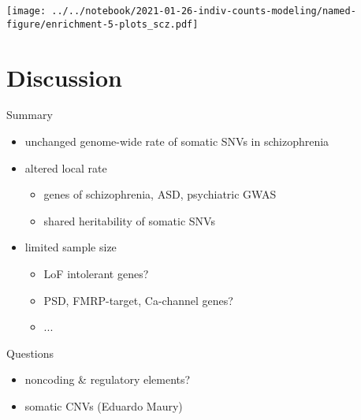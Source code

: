 \documentclass[usenames,dvipsnames]{beamer}
\begin{document}

\begin{frame}[label=results]
\texttt{[image: ../../notebook/2021-01-26-indiv-counts-modeling/named-figure/enrichment-5-plots\_scz.pdf]}
\end{frame}

\section{Discussion}




\begin{frame}{Summary}
\begin{itemize}
\item unchanged genome-wide rate of somatic SNVs in schizophrenia
\item altered local rate
\begin{itemize}
	\item genes of schizophrenia, ASD, psychiatric GWAS
        \item shared heritability of somatic SNVs
\end{itemize}
\item limited sample size
\begin{itemize}
	\item LoF intolerant genes?
	\item PSD, FMRP-target, Ca-channel genes?
	\item ...
\end{itemize}
\end{itemize}
\end{frame}

\begin{frame}{Questions}
\begin{itemize}
\item noncoding \& regulatory elements?
\item somatic CNVs (Eduardo Maury)
\end{itemize}
\end{frame}
\end{document}
